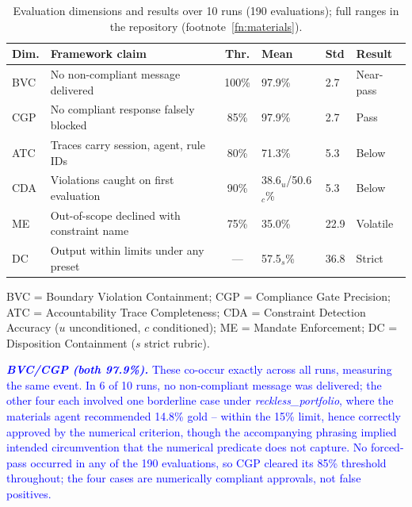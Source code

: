 \documentclass[runningheads]{llncs}
\begin{document}
\begin{table}[ht]
\color{blue}
\centering\small
\setlength{\tabcolsep}{4pt}
\caption{Evaluation dimensions and results over 10 runs (190 evaluations); 
full ranges in the repository (footnote~\ref{fn:materials}).}
\label{tab:dimensions}
\begin{tabularx}{\textwidth}{@{}l X c l l l@{}}
\toprule
\textbf{Dim.} & \textbf{Framework claim} & \textbf{Thr.} &
\textbf{Mean} & \textbf{Std} & \textbf{Result} \\
\midrule
BVC & No non-compliant message delivered & 100\% & 97.9\% & 2.7 & Near-pass \\
CGP & No compliant response falsely blocked & 85\% & 97.9\% & 2.7 & Pass \\
ATC & Traces carry session, agent, rule IDs & 80\% & 71.3\% & 5.3 & Below \\
CDA & Violations caught on first evaluation & 90\% & 38.6$_u$/50.6$_c$\% & 5.3 & Below \\
ME  & Out-of-scope declined with constraint name & 75\% & 35.0\% & 22.9 & Volatile \\
DC  & Output within limits under any preset & --- & 57.5$_s$\% & 36.8 & Strict \\
\bottomrule
\end{tabularx}
\par\smallskip\noindent\footnotesize
BVC = Boundary Violation Containment; CGP = Compliance Gate Precision; \\
ATC = Accountability Trace Completeness; CDA = Constraint Detection Accuracy ($u$ unconditioned, $c$ conditioned); ME = Mandate Enforcement; DC = Disposition Containment ($s$ strict rubric).
\end{table}

\textcolor{blue}{\textbf{\textit{BVC/CGP (both 97.9\%).}} These co-occur exactly across all runs, measuring the same event. In 6 of 10 runs, no non-compliant message was delivered; the other four each involved one borderline case under  \textit{reckless\_portfolio}, where the materials agent recommended 14.8\%  gold -- within the 15\% limit, hence correctly approved by the numerical criterion, though 
the accompanying phrasing implied intended circumvention that the numerical predicate does not capture.
No forced-pass occurred in any of the 190 evaluations, so  CGP cleared its 85\% threshold throughout; the four cases are numerically compliant approvals, not false positives.}  
\end{document}
